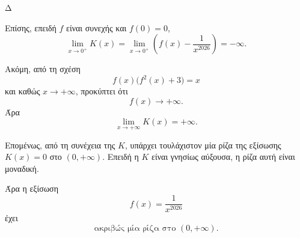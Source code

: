 \begin{thema}{Δ}
\begin{erwthma}
Επίσης, επειδή $f$ είναι συνεχής και $f(0)=0$,
\[
\lim_{x\to0^+}K(x)
=\lim_{x\to0^+}\left(f(x)-\frac{1}{x^{2026}}\right)
=-\infty.
\]

Ακόμη, από τη σχέση
\[
f(x)\bigl(f^2(x)+3\bigr)=x
\]
και καθώς $x\to+\infty$, προκύπτει ότι
\[
f(x)\to+\infty.
\]
Άρα
\[
\lim_{x\to+\infty}K(x)=+\infty.
\]

Επομένως, από τη συνέχεια της $K$, υπάρχει τουλάχιστον μία ρίζα της εξίσωσης $K(x)=0$ στο $(0,+\infty)$. Επειδή η $K$ είναι γνησίως αύξουσα, η ρίζα αυτή είναι μοναδική.

Άρα η εξίσωση
\[
f(x)=\frac{1}{x^{2026}}
\]
έχει
\[
{\text{ακριβώς μία ρίζα στο }(0,+\infty)}.
\]
\end{erwthma}
\end{thema}
